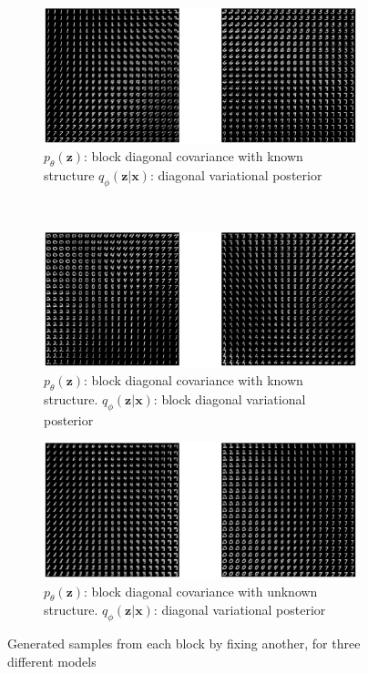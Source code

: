 \begin{figure}
\centering
	\begin{subfigure}[b]{1\textwidth}
    \includegraphics[width=\textwidth]{images/sampleNWdiag.eps}
    \caption{$p_{\theta}(\mathbf{z})$: block diagonal covariance with known structure $q_{\phi}(\mathbf{z}|\mathbf{x})$: diagonal variational posterior}
    \label{fig:us-air}
    \end{subfigure}
	~ %
    \begin{subfigure}[b]{1\textwidth}
    \includegraphics[width=\textwidth]{images/sampleNWblock.eps}
    \caption{$p_{\theta}(\mathbf{z})$: block diagonal covariance with known structure. $q_{\phi}(\mathbf{z}|\mathbf{x})$: block diagonal variational posterior}
    \label{fig:us-air}
    \end{subfigure}
    
    \begin{subfigure}[b]{1\textwidth}
    \includegraphics[width=\textwidth]{images/sampleAverage.eps}
    \caption{$p_{\theta}(\mathbf{z})$: block diagonal covariance with unknown structure. $q_{\phi}(\mathbf{z}|\mathbf{x})$: diagonal variational posterior}
    \label{fig:us-air}
    \end{subfigure}
    \caption{Generated samples from each block by fixing another, for three different models}\label{fig:animals}
\end{figure}


